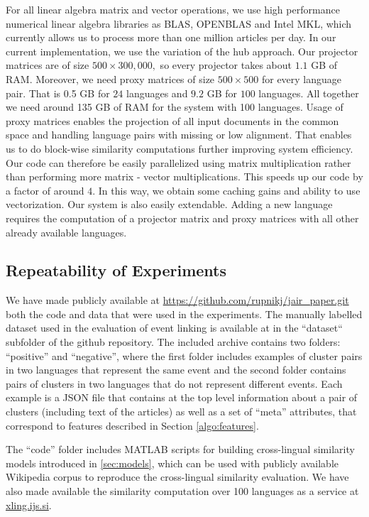 \documentclass[twoside,11pt]{article}
\begin{document}
For all linear algebra matrix and vector operations, we use high performance numerical linear algebra libraries as BLAS, OPENBLAS and Intel MKL, which currently allows us to process more than one million articles per day.
In our current implementation, we use the variation of the hub approach. Our projector matrices are of size $500\times 300,000,$ so every projector takes about $1.1$ GB of RAM. Moreover, we need proxy matrices of size $500\times500$ for every language pair. That is 0.5 GB for $24$ languages and $9.2$ GB for $100$ languages. All together we need around 135 GB of RAM for the system with 100 languages.
 Usage of proxy matrices enables the projection of all input documents in the common space and handling language pairs with missing or low alignment. That enables us to do block-wise similarity computations further improving system efficiency. Our code can therefore be easily parallelized using matrix multiplication rather than performing more matrix - vector multiplications. This speeds up our code by a factor of around $4.$ In this way, we obtain some caching gains and ability to use vectorization.
Our system is also easily extendable. Adding a new language requires the  computation of  a projector matrix and proxy matrices with all other already available languages.

\subsection{Repeatability of Experiments}
We have made publicly available at \url{https://github.com/rupnikj/jair_paper.git} both the code and data that were used in the experiments.
The manually labelled dataset used in the evaluation of event linking is available at in the ``dataset`` subfolder of the github repository. The included archive contains two folders: ``positive'' and ``negative'', where the first folder includes examples of cluster pairs in two languages that represent the same event and the second folder contains pairs of clusters in two languages that do not represent different events. Each example is a JSON file that contains at the top level information about a pair of clusters (including text of the articles) as well as a set of ``meta'' attributes, that correspond to features described in Section \ref{algo:features}.

The ``code'' folder includes MATLAB scripts for building cross-lingual similarity models introduced in \ref{sec:models}, which can be used with publicly available Wikipedia corpus to reproduce the cross-lingual similarity evaluation. We have also made available the similarity computation over 100 languages as a service at \url{xling.ijs.si}.
\end{document}
